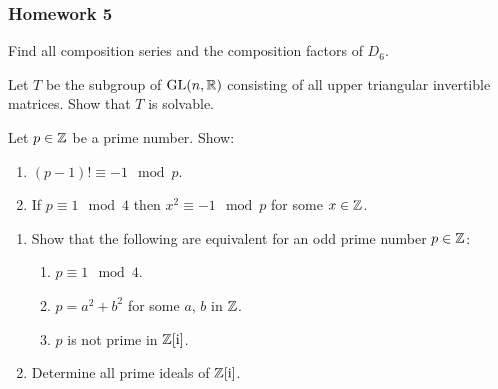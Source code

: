 \subsubsection{Homework 5}
\setcounter{exercise}{0}
\setcounter{equation}{0}

\begin{problem}
  Find all composition series and the composition factors of \(D_6\).
\end{problem}
\begin{solution}
\end{solution}

\begin{problem}
  Let \(T\) be the subgroup of \(\mathrm{GL}(n,\mathbb{R})\) consisting of all upper
  triangular invertible matrices. Show that \(T\) is solvable.
\end{problem}
\begin{solution}
\end{solution}

\begin{problem}
  Let \(p\in\mathbb{Z}\) be a prime number. Show:
  \begin{enumerate}[label=(\alph*),noitemsep]
  \item \((p-1)!\equiv -1\mod{p}\).
  \item If \(p\equiv 1\mod{4}\) then \(x^2\equiv-1\mod{p}\) for some
    \(x\in\mathbb{Z}\).
  \end{enumerate}
\end{problem}
\begin{solution}
\end{solution}

\begin{problem}
  \hfill
  \begin{enumerate}[label=(\alph*),noitemsep]
  \item Show that the following are equivalent for an odd prime number
    \(p\in\mathbb{Z}\):
    \begin{enumerate}[label=(\roman*),noitemsep]
    \item \(p\equiv 1\mod 4\).
    \item \(p=a^2+b^2\) for some \(a\), \(b\) in \(\mathbb{Z}\).
    \item \(p\) is not prime in \(\mathbb{Z}[\mathrm{i}]\).
    \end{enumerate}
  \item Determine all prime ideals of \(\mathbb{Z}[\mathrm{i}]\).
  \end{enumerate}
\end{problem}
\begin{solution}
\end{solution}


